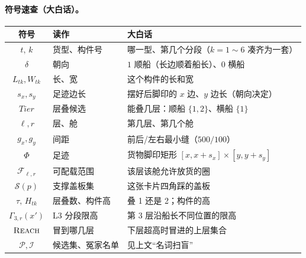 \documentclass[11pt]{ctexart}
\begin{document}
\paragraph{符号速查（大白话）。}
\begin{center}\small
\begin{longtable}{@{}c l l@{}}
\toprule 符号 & 读作 & 大白话 \\ \midrule\endhead
$t,\,k$ & 货型、构件号 & 哪一型、第几个分段（$k{=}1\!\sim\!6$ 凑齐为一套） \\
$\delta$ & 朝向 & $1$ 顺船（长边顺着船长）、$0$ 横船 \\
$L_{tk},W_{tk}$ & 长、宽 & 这个构件的长和宽 \\
$s_x,s_y$ & 足迹边长 & 摆好后脚印的 $x$ 边、$y$ 边长（朝向决定） \\
$\textit{Tier}$ & 层叠候选 & 能叠几层：顺船 $\{1,2\}$、横船 $\{1\}$ \\
$\ell,r$ & 层、舱 & 第几层、第几个舱 \\
$g_x,g_y$ & 间距 & 前后/左右最小缝（$500/100$） \\
$\Phi$ & 足迹 & 货物脚印矩形 $[x,x{+}s_x]\times[y,y{+}s_y]$ \\
$\mathcal{F}_{\ell,r}$ & 可配载范围 & 该层该舱允许放货的圈 \\
$\mathcal{S}(p)$ & 支撑盖板集 & 这张卡片四角踩的盖板 \\
$\tau,\,H_{tk}$ & 层叠数、构件高 & 叠 1 还是 2；构件的高 \\
$\Gamma_{3,r}(x')$ & L3 分段限高 & 第 3 层沿船长不同位置的限高 \\
$\textsc{Reach}$ & 冒到哪几层 & 下层超高时冒进的上层集合 \\
$\mathcal{P},\mathcal{I}$ & 候选集、冤家名单 & 见上文“名词扫盲” \\
\bottomrule
\end{longtable}
\end{center}
\end{document}
